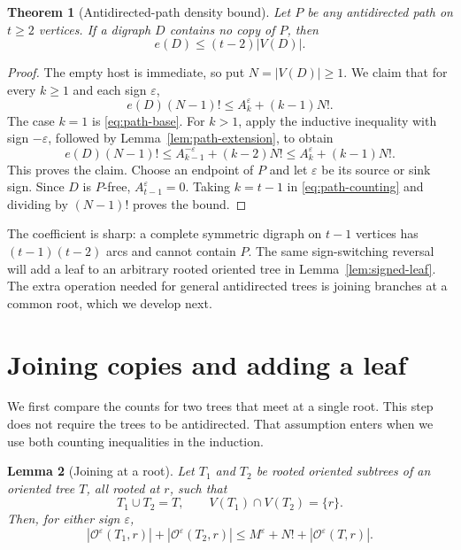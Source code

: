 \documentclass[11pt]{article}
\numberwithin{equation}{section}
\newtheorem{theorem}{Theorem}[section]
\newtheorem{lemma}[theorem]{Lemma}
\theoremstyle{definition}
\newcommand{\cO}{\mathcal O}
\begin{document}
\begin{theorem}[Antidirected-path density bound]
\label{thm:path-density}
Let $P$ be any antidirected path on $t\geq2$ vertices.  If a digraph
$D$ contains no copy of $P$, then
\[
 e(D)\leq(t-2)|V(D)|.
\]
\end{theorem}

\begin{proof}
The empty host is immediate, so put $N=|V(D)|\geq1$.  We claim that
for every $k\geq1$ and each sign $\varepsilon$,
\begin{equation}
 e(D)(N-1)!\leq A_k^\varepsilon+(k-1)N!.
 \label{eq:path-counting}
\end{equation}
The case $k=1$ is \eqref{eq:path-base}.  For $k>1$, apply the
inductive inequality with sign $-\varepsilon$, followed by
Lemma~\ref{lem:path-extension}, to obtain
\[
 e(D)(N-1)!
 \leq A_{k-1}^{-\varepsilon}+(k-2)N!
 \leq A_k^\varepsilon+(k-1)N!.
\]
This proves the claim.  Choose an endpoint of $P$ and let
$\varepsilon$ be its source or sink sign.  Since $D$ is $P$-free,
$A_{t-1}^\varepsilon=0$.  Taking $k=t-1$ in
\eqref{eq:path-counting} and dividing by $(N-1)!$ proves the bound.
\end{proof}

The coefficient is sharp: a complete symmetric digraph on $t-1$
vertices has $(t-1)(t-2)$ arcs and cannot contain $P$.
The same sign-switching reversal will add a leaf to an arbitrary
rooted oriented tree in Lemma~\ref{lem:signed-leaf}.  The extra
operation needed for general antidirected trees is joining branches
at a common root, which we develop next.

\section{Joining copies and adding a leaf}
\label{sec:signed-injections}

We first compare the counts for two trees that meet at a single root.
This step does not require the trees to be antidirected.  That
assumption enters when we use both counting inequalities in the induction.

\begin{lemma}[Joining at a root]
\label{lem:signed-branch}
Let $T_1$ and $T_2$ be rooted oriented subtrees of an oriented tree $T$,
all rooted at $r$, such that
\[
 T_1\cup T_2=T,
 \qquad
 V(T_1)\cap V(T_2)=\{r\}.
\]
Then, for either sign $\varepsilon$,
\begin{equation}
 |\cO^\varepsilon(T_1,r)|+|\cO^\varepsilon(T_2,r)|
 \leq M^\varepsilon+N!+|\cO^\varepsilon(T,r)|.
 \label{eq:signed-branch}
\end{equation}
\end{lemma}
\end{document}
